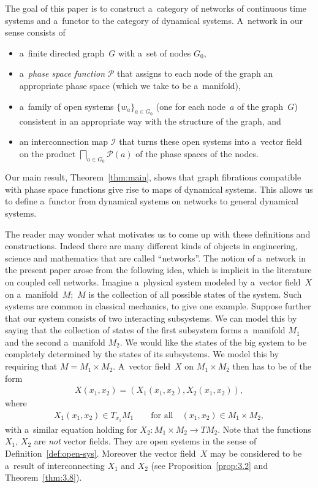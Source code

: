 \documentclass[pdftex]{sigma}
\numberwithin{equation}{section}
\begin{document}
The goal of this paper is to construct a~category of networks of continuous time systems and a~functor to the category
of dynamical systems.
A~network in our sense consists of
\begin{itemize}\itemsep=0pt

\item a~f\/inite directed graph~$G$ with a~set of nodes $G_0$,

\item a~{\em phase space function} ${\mathcal P}$ that assigns to each node of the graph an appropriate phase space
(which we take to be a~manifold),

\item a~family of open systems $\{w_a\}_{a\in G_0}$ (one for each node~$a$ of the graph~$G$) consistent in an
appropriate way with the structure of the graph, and

\item an interconnection map $\mathscr{I}$ that turns these open systems into a~vector f\/ield on the product
$\bigsqcap\limits_{a\in G_0} {\mathcal P} (a)$ of the phase spaces of the nodes.
\end{itemize}
Our main result, Theorem~\ref{thm:main}, shows that graph f\/ibrations compatible with phase space functions give rise to
maps of dynamical systems.
This allows us to def\/ine a~functor from dynamical systems on networks to general dynamical systems.

The reader may wonder what motivates us to come up with these def\/initions and constructions.
Indeed there are many dif\/ferent kinds of objects in engineering, science and mathematics that are called ``networks''.
The notion of a~network in the present paper arose from the follo\-wing idea, which is implicit in the literature on
coupled cell networks.
Imagine a~physical system modeled by a~vector f\/ield~$X$ on a~manifold~$M$;~$M$ is the collection of all possible states
of the system.
Such systems are common in classical mechanics, to give one example.
Suppose further that our system consists of two interacting subsystems.
We can model this by saying that the collection of states of the f\/irst subsystem forms a~manifold $M_1$ and the second
a~manifold $M_2$.
We would like the states of the big system to be completely determined by the states of its subsystems.
We model this by requiring that $M = M_1 \times M_2$.
A~vector f\/ield~$X$ on $M_1\times M_2$ then has to be of the form
\begin{gather*}
X(x_1,x_2) = (X_1(x_1,x_2), X_2(x_1,x_2)),
\end{gather*}
where
\begin{gather*}
X_1(x_1,x_2) \in T_{x_1}M_1
\qquad
\text{for all}
\quad
(x_1,x_2)\in M_1\times M_2,
\end{gather*}
with a~similar equation holding for $X_2\colon M_1 \times M_2 \to TM_2$.
Note that the functions $X_1$, $X_2$ are {\em not} vector f\/ields.
They are open systems in the sense of Def\/inition~\ref{def:open-sys}.
Moreover the vector f\/ield~$X$ may be considered to be a~result of interconnecting $X_1$ and $X_2$ (see
Proposition~\ref{prop:3.2} and Theorem~\ref{thm:3.8}).
\end{document}
